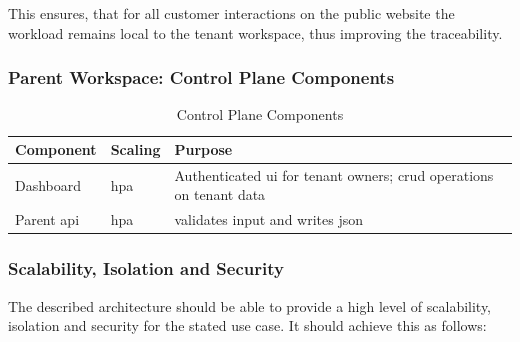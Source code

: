 \documentclass[11pt, a4paper, oneside, listof=totoc]{scrartcl}
\begin{document}
                This ensures, that for all customer interactions on the public website the workload
                remains local to the tenant workspace, thus improving the traceability.

            \subsubsection{Parent Workspace: Control Plane Components}\label{subsubsec:controlPlaneComponents}
                
                \begin{table}[H]\label{tab:parentComponents}
                    \centering
                    \renewcommand{\arraystretch}{1.5}
                    \begin{tabular}{lp{3.5cm}P{8cm}}
                        \toprule
                        Component & Scaling & Purpose \\
                        \midrule
                        Dashboard & \gls{hpa} & Authenticated \gls{ui} for tenant owners; \gls{crud} operations on tenant data \\
                        Parent \gls{api} & \gls{hpa} & validates input and writes \gls{json} \\
                        \bottomrule
                    \end{tabular}
                    \caption{Control Plane Components}
                \end{table}

            \subsubsection{Scalability, Isolation and Security}\label{scalabilityIsolationSecurity}
                The described architecture should be able to provide a high level of scalability,
                isolation and security for the stated use case.
                It should achieve this as follows:
\end{document}
